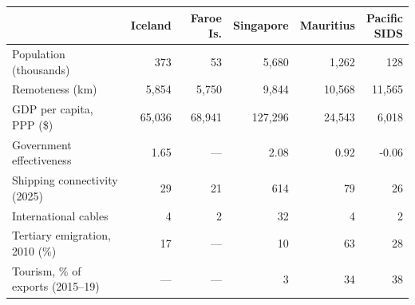 \begin{tabular}{@{}l*{5}{r}@{}}
\toprule
 & Iceland & Faroe Is. & Singapore & Mauritius & \makecell[r]{Pacific\\SIDS} \\
\midrule
Population (thousands) & 373 & 53 & 5{,}680 & 1{,}262 & 128 \\
Remoteness (km) & 5{,}854 & 5{,}750 & 9{,}844 & 10{,}568 & 11{,}565 \\
GDP per capita, PPP (\$) & 65{,}036 & 68{,}941 & 127{,}296 & 24{,}543 & 6{,}018 \\
Government effectiveness & 1.65 & --- & 2.08 & 0.92 & -0.06 \\
Shipping connectivity (2025) & 29 & 21 & 614 & 79 & 26 \\
International cables & 4 & 2 & 32 & 4 & 2 \\
Tertiary emigration, 2010 (\%) & 17 & --- & 10 & 63 & 28 \\
Tourism, \% of exports (2015--19) & --- & --- & 3 & 34 & 38 \\
\bottomrule
\end{tabular}
